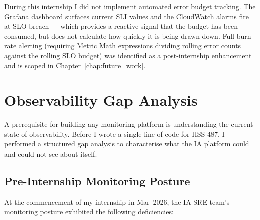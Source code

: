 During this internship I did not implement automated error budget
tracking. The Grafana dashboard surfaces current SLI values and the
CloudWatch alarms fire at SLO breach --- which provides a reactive
signal that the budget has been consumed, but does not calculate how
quickly it is being drawn down. Full burn-rate alerting (requiring
Metric Math expressions dividing rolling error counts against the
rolling SLO budget) was identified as a post-internship enhancement
and is scoped in Chapter~\ref{chap:future_work}.

\section{Observability Gap Analysis}
\label{sec:observability_gap}

A prerequisite for building any monitoring platform is understanding the
current state of observability. Before I wrote a single line of code
for IISS-487, I performed a structured gap analysis to characterise
what the IA platform could and could not see about itself.

\subsection{Pre-Internship Monitoring Posture}

At the commencement of my internship in Mar~2026, the IA-SRE team's
monitoring posture exhibited the following deficiencies:

